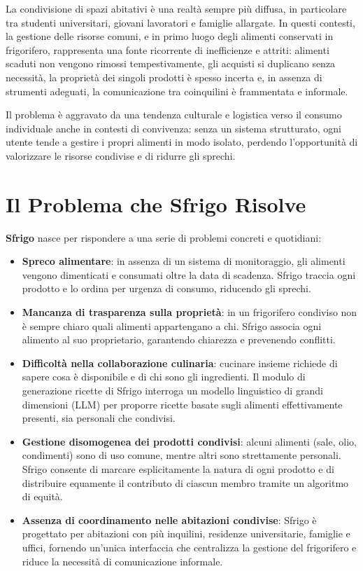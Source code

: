 \documentclass[12pt,a4paper,twoside]{report}
\begin{document}
La condivisione di spazi abitativi è una realtà sempre più diffusa, in particolare tra studenti universitari, giovani lavoratori e famiglie allargate. In questi contesti, la gestione delle risorse comuni, e in primo luogo degli alimenti conservati in frigorifero, rappresenta una fonte ricorrente di inefficienze e attriti: alimenti scaduti non vengono rimossi tempestivamente, gli acquisti si duplicano senza necessità, la proprietà dei singoli prodotti è spesso incerta e, in assenza di strumenti adeguati, la comunicazione tra coinquilini è frammentata e informale.

Il problema è aggravato da una tendenza culturale e logistica verso il consumo individuale anche in contesti di convivenza: senza un sistema strutturato, ogni utente tende a gestire i propri alimenti in modo isolato, perdendo l'opportunità di valorizzare le risorse condivise e di ridurre gli sprechi.

\section{Il Problema che Sfrigo Risolve}

\textbf{Sfrigo} nasce per rispondere a una serie di problemi concreti e quotidiani:

\begin{itemize}
  \item \textbf{Spreco alimentare}: in assenza di un sistema di monitoraggio, gli alimenti vengono dimenticati e consumati oltre la data di scadenza. Sfrigo traccia ogni prodotto e lo ordina per urgenza di consumo, riducendo gli sprechi.
  \item \textbf{Mancanza di trasparenza sulla proprietà}: in un frigorifero condiviso non è sempre chiaro quali alimenti appartengano a chi. Sfrigo associa ogni alimento al suo proprietario, garantendo chiarezza e prevenendo conflitti.
  \item \textbf{Difficoltà nella collaborazione culinaria}: cucinare insieme richiede di sapere cosa è disponibile e di chi sono gli ingredienti. Il modulo di generazione ricette di Sfrigo interroga un modello linguistico di grandi dimensioni (LLM) per proporre ricette basate sugli alimenti effettivamente presenti, sia personali che condivisi.
  \item \textbf{Gestione disomogenea dei prodotti condivisi}: alcuni alimenti (sale, olio, condimenti) sono di uso comune, mentre altri sono strettamente personali. Sfrigo consente di marcare esplicitamente la natura di ogni prodotto e di distribuire equamente il contributo di ciascun membro tramite un algoritmo di equità.
  \item \textbf{Assenza di coordinamento nelle abitazioni condivise}: Sfrigo è progettato per abitazioni con più inquilini, residenze universitarie, famiglie e uffici, fornendo un'unica interfaccia che centralizza la gestione del frigorifero e riduce la necessità di comunicazione informale.
\end{itemize}
\end{document}
